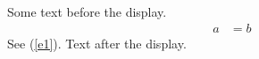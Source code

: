 \documentclass[12pt]{article}
\begin{document}
Some text before the display.
\begin{align} a &= b \label{e1} \end{align} See (\ref{e1}).
Text after the display.
\end{document}
